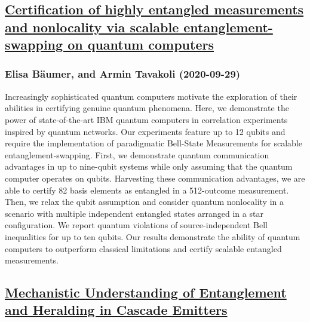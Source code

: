 \subsection*{\href{http://arxiv.org/abs/2009.14028v1}{Certification of highly entangled measurements and nonlocality via  scalable entanglement-swapping on quantum computers}}
\subsubsection*{Elisa Bäumer, and Armin Tavakoli (2020-09-29)}
Increasingly sophisticated quantum computers motivate the exploration of
their abilities in certifying genuine quantum phenomena. Here, we demonstrate
the power of state-of-the-art IBM quantum computers in correlation experiments
inspired by quantum networks. Our experiments feature up to 12 qubits and
require the implementation of paradigmatic Bell-State Measurements for scalable
entanglement-swapping. First, we demonstrate quantum communication advantages
in up to nine-qubit systems while only assuming that the quantum computer
operates on qubits. Harvesting these communication advantages, we are able to
certify 82 basis elements as entangled in a 512-outcome measurement. Then, we
relax the qubit assumption and consider quantum nonlocality in a scenario with
multiple independent entangled states arranged in a star configuration. We
report quantum violations of source-independent Bell inequalities for up to ten
qubits. Our results demonstrate the ability of quantum computers to outperform
classical limitations and certify scalable entangled measurements.

\subsection*{\href{http://arxiv.org/abs/2009.14008v1}{Mechanistic Understanding of Entanglement and Heralding in Cascade  Emitters}}

